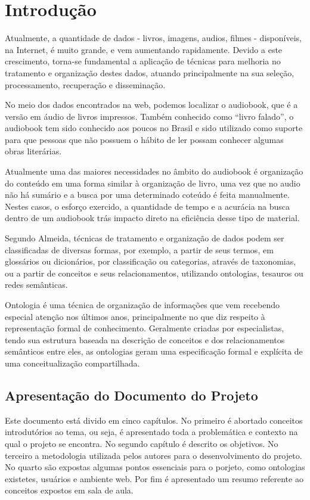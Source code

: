 \chapter[Introdução]{Introdução}\label{cap1}
		
Atualmente, a quantidade de dados - livros, imagens, audios, filmes - disponíveis, na Internet, é muito grande, e vem aumentando rapidamente. Devido a este crescimento, torna-se fundamental a aplicação de técnicas para melhoria no tratamento e organização destes dados, atuando principalmente na sua seleção, processamento, recuperação e disseminação.\cite{UVG}

No meio dos dados encontrados na web, podemos localizar o audiobook, que é a versão em áudio de livros impressos. Também conhecido como “livro falado”, o audiobook tem sido conhecido aos poucos no Brasil e sido utilizado como suporte para que pessoas que não possuem o hábito de ler possam conhecer algumas obras literárias.

Atualmente uma das maiores necessidades no âmbito do audiobook é organização do conteúdo em uma forma similar à organização de livro, uma vez que no audio não há sumário e a busca por uma determinado coteúdo é feita manualmente. Nestes casos, o esforço exercido, a quantidade de tempo e a acurácia na busca dentro de um audiobook trás impacto direto na eficiência desse tipo de material.

Segundo Almeida\cite{UVG}, técnicas de tratamento e organização de dados podem ser classificadas de diversas formas, por exemplo, a partir de seus termos, em glossários ou dicionários, por classificação ou categorias, através de taxonomias, ou a partir de conceitos e seus relacionamentos, utilizando ontologias, tesauros ou redes semânticas.\cite{TSW}

Ontologia é uma técnica de organização de informações que vem recebendo especial atenção nos últimos anos, principalmente no que diz respeito à representação formal de conhecimento. Geralmente criadas por especialistas, tendo sua estrutura baseada na descrição de conceitos e dos relacionamentos semânticos entre eles, as ontologias geram uma especificação formal e explícita de uma conceitualização compartilhada.


\section{Apresentação do Documento do Projeto}

Este documento está divido em cinco capítulos. No primeiro é abortado conceitos introdutórios ao tema, ou seja, é apresentado toda a problemática  e contexto na qual o projeto se encontra. No segundo capítulo é descrito os objetivos. No terceiro a metodologia utilizada pelos autores para o desenvolvimento do projeto. No quarto são expostas algumas pontos essenciais para o porjeto, como ontologias existetes, usuários e ambiente web. Por fim é apresentado um resumo referente ao conceitos expostos em sala de aula.

